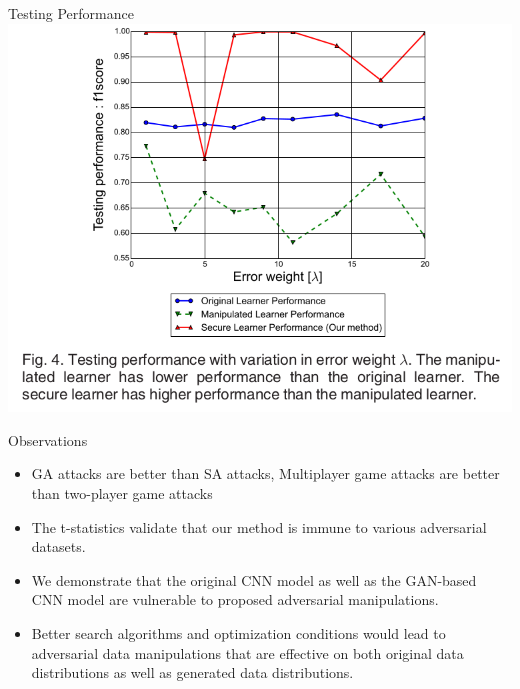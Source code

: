 \documentclass[10pt]{beamer}
\begin{document}
\begin{frame}{Testing Performance}
    \includegraphics[scale=0.3]{images/Fig4.png}
\end{frame}


\begin{frame}{Observations}
	\begin{itemize}
        \item GA attacks are better than SA attacks, Multiplayer game attacks are better than two-player game attacks
        \item The t-statistics validate that our method is immune to various adversarial datasets.
        \item We demonstrate that the original CNN model as well as the GAN-based CNN model are vulnerable to proposed adversarial manipulations.
        \item Better search algorithms and optimization conditions would lead to adversarial data manipulations that are effective on both original data distributions as well as generated data distributions.
	\end{itemize}
\end{frame}





















\end{document}
